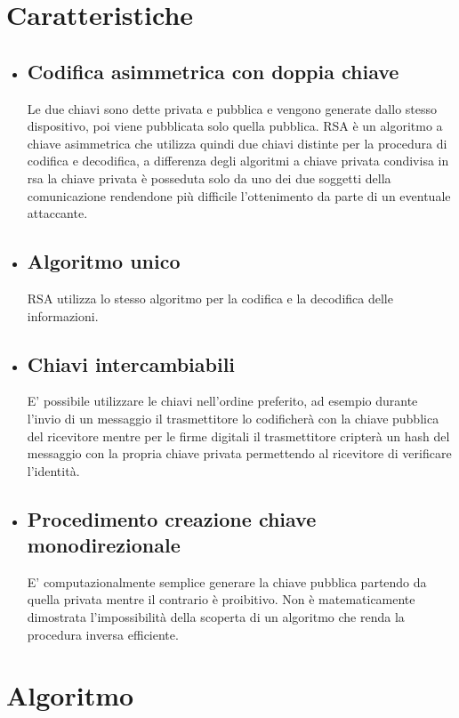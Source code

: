 \begin{itemize}
\section{Caratteristiche}
\begin{itemize}
\item \subsection{Codifica asimmetrica con doppia chiave} Le due chiavi sono dette privata e pubblica e vengono generate dallo stesso dispositivo, poi viene pubblicata solo quella pubblica. RSA è un algoritmo a chiave asimmetrica che utilizza quindi due chiavi distinte per la procedura di codifica e decodifica, a differenza degli algoritmi a chiave privata condivisa in rsa la chiave privata è posseduta solo da uno dei due soggetti della comunicazione rendendone più difficile l'ottenimento da parte di un eventuale attaccante.\cite{brunato}
\item \subsection{Algoritmo unico}
RSA utilizza lo stesso algoritmo per la codifica e la decodifica delle informazioni.\cite{brunato}
\item \subsection{Chiavi intercambiabili}
E' possibile utilizzare le chiavi nell'ordine preferito, ad esempio durante l'invio di un messaggio il trasmettitore lo codificherà con la chiave pubblica del ricevitore mentre per le firme digitali il trasmettitore cripterà un hash del messaggio con la propria chiave privata permettendo al ricevitore di verificare l'identità.\cite{brunato}
\item \subsection{Procedimento creazione chiave monodirezionale} E' computazionalmente semplice generare la chiave pubblica partendo da quella privata mentre il contrario è proibitivo. Non è matematicamente dimostrata l'impossibilità della scoperta di un algoritmo che renda la procedura inversa efficiente.\cite{brunato}
\end{itemize}

\section{Algoritmo} 

\end{itemize}
